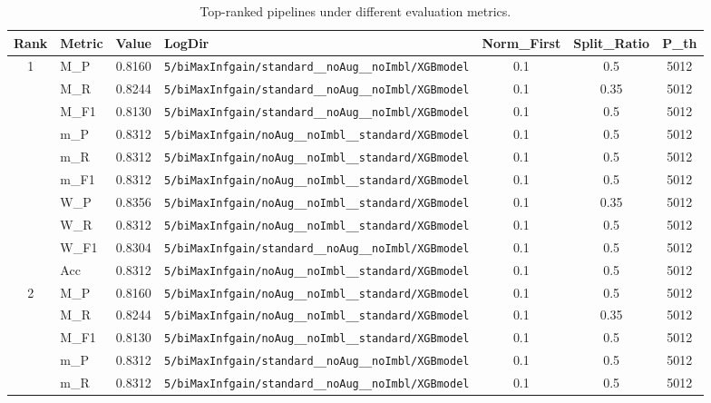 \begin{table}[htbp]
\caption{Top-ranked pipelines under different evaluation metrics.}
\label{tab:rank_metric_vertical}
\centering
\small
\setlength{\tabcolsep}{4pt}
\begin{tabular}{|c|l|c|>{\ttfamily\footnotesize}p{7.2cm}|c|c|c|}
\hline
Rank & Metric & Value & LogDir & Norm\_First & Split\_Ratio & P\_th \\
\hline
\multirow{10}{*}{1} & M\_P & 0.8160 & \texttt{5/biMaxInfgain/standard\_\_noAug\_\_noImbl/XGBmodel} & 0.1 & 0.5  & 5012 \\ 
 & M\_R & 0.8244 & \texttt{5/biMaxInfgain/standard\_\_noAug\_\_noImbl/XGBmodel} & 0.1 & 0.35  & 5012 \\ 
 & M\_F1 & 0.8130 & \texttt{5/biMaxInfgain/standard\_\_noAug\_\_noImbl/XGBmodel} & 0.1 & 0.5  & 5012 \\ 
 & m\_P & 0.8312 & \texttt{5/biMaxInfgain/noAug\_\_noImbl\_\_standard/XGBmodel} & 0.1 & 0.5  & 5012 \\ 
 & m\_R & 0.8312 & \texttt{5/biMaxInfgain/noAug\_\_noImbl\_\_standard/XGBmodel} & 0.1 & 0.5  & 5012 \\ 
 & m\_F1 & 0.8312 & \texttt{5/biMaxInfgain/noAug\_\_noImbl\_\_standard/XGBmodel} & 0.1 & 0.5  & 5012 \\ 
 & W\_P & 0.8356 & \texttt{5/biMaxInfgain/noAug\_\_noImbl\_\_standard/XGBmodel} & 0.1 & 0.35  & 5012 \\ 
 & W\_R & 0.8312 & \texttt{5/biMaxInfgain/noAug\_\_noImbl\_\_standard/XGBmodel} & 0.1 & 0.5  & 5012 \\ 
 & W\_F1 & 0.8304 & \texttt{5/biMaxInfgain/standard\_\_noAug\_\_noImbl/XGBmodel} & 0.1 & 0.5  & 5012 \\ 
 & Acc & 0.8312 & \texttt{5/biMaxInfgain/noAug\_\_noImbl\_\_standard/XGBmodel} & 0.1 & 0.5  & 5012 \\ 
\hline
\multirow{10}{*}{2} & M\_P & 0.8160 & \texttt{5/biMaxInfgain/noAug\_\_noImbl\_\_standard/XGBmodel} & 0.1 & 0.5  & 5012 \\ 
 & M\_R & 0.8244 & \texttt{5/biMaxInfgain/noAug\_\_noImbl\_\_standard/XGBmodel} & 0.1 & 0.35  & 5012 \\ 
 & M\_F1 & 0.8130 & \texttt{5/biMaxInfgain/noAug\_\_noImbl\_\_standard/XGBmodel} & 0.1 & 0.5  & 5012 \\ 
 & m\_P & 0.8312 & \texttt{5/biMaxInfgain/standard\_\_noAug\_\_noImbl/XGBmodel} & 0.1 & 0.5  & 5012 \\ 
 & m\_R & 0.8312 & \texttt{5/biMaxInfgain/standard\_\_noAug\_\_noImbl/XGBmodel} & 0.1 & 0.5  & 5012 \\ 

\end{tabular}
\end{table}
